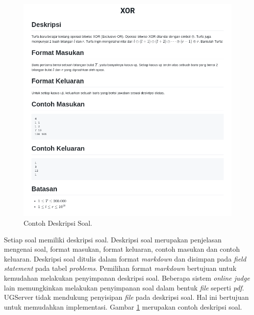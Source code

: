 \begin{figure}[ht!]
    \centering
    \includegraphics[width=\textwidth]{images/problem-desc-example}
    \caption{Contoh Deskripsi Soal.}
    \label{fig:problem-desc-example}
\end{figure}

\par Setiap soal memiliki deskripsi soal. Deskripsi soal merupakan penjelasan mengenai soal, format masukan, format keluaran, contoh masukan dan contoh keluaran. Deskripsi soal ditulis dalam format \textit{markdown} dan disimpan pada \textit{field} \textit{statement} pada tabel \textit{problems}. Pemilihan format \textit{markdown} bertujuan untuk kemudahan melakukan penyimpanan deskripsi soal. Beberapa sistem \textit{online judge} lain memungkinkan melakukan penyimpanan soal dalam bentuk \textit{file} seperti \textit{pdf}. UGServer tidak mendukung penyisipan \textit{file} pada deskripsi soal. Hal ini bertujuan untuk memudahkan implementasi. Gambar \ref{fig:problem-desc-example} merupakan contoh deskripsi soal.

